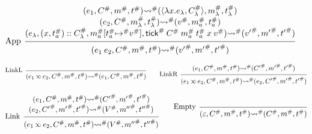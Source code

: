 \documentclass[acmsmall,review]{acmart}\settopmatter{printfolios=true,printccs=false,printacmref=false}
\theoremstyle{definition}
\newcommand*{\cons}{::}
\newcommand*{\A}[1]{{#1}^{\#}}
\newcommand*{\mem}{m}
\newcommand*{\semarrow}{\rightsquigarrow}
\newcommand*{\semlink}{\mathbin{\rotatebox[origin=c]{180}{$\propto$}}}
\newcommand*{\link}[2]{{#1}\semlink{#2}}
\newcommand*{\tick}{\mathsf{tick}}
\begin{document}
\begin{figure}[h!]
  \[
    \begin{prooftree}
      \hypo{
        \begin{matrix}
          (e_{1}, \A{C}, \A\mem, \A{t})
          \A\semarrow
          (\langle\lambda x.e_{\lambda}, \A{C}_{\lambda}\rangle, \A\mem_{\lambda}, \A{t}_{\lambda}) \\
          (e_{2}, \A{C}, \A\mem_{\lambda}, \A{t}_{\lambda})
          \A\semarrow
          (\A{v}, \A\mem_{a}, \A{t}_{a})                                                            \\
          (e_{\lambda}, (x, \A{t}_{a})\cons \A{C}_{\lambda}, \A\mem_{a}[\A{t}_{a}\A\mapsto \A{v}], \A\tick\:\A{C}\:\A\mem_{a}\:\A{t}_{a}\:x\:\A{v})
          \A\semarrow
          (\A{v'}, \A{\mem'},\A{t'})
        \end{matrix}
      }
      \infer[left label={App}]1{
      (e_{1}\:e_{2}, \A{C}, \A\mem, \A{t})
      \A\semarrow
      (\A{v'}, \A{\mem'},\A{t'})
      }
    \end{prooftree}
  \]

  \[
    \begin{prooftree}
      \infer[left label=LinkL]0{
      (\link{e_{1}}{e_{2}}, \A{C}, \A\mem, \A{t})
      \A\semarrow
      (e_{1}, \A{C}, \A\mem, \A{t})
      }
    \end{prooftree}\qquad
    \begin{prooftree}
      \hypo{
        \begin{matrix}
          (e_{1}, \A{C}, \A\mem, \A{t})
          \A\semarrow
          (\A{C'}, \A{\mem'}, \A{t'})
        \end{matrix}
      }
      \infer[left label=LinkR]1{
      (\link{e_{1}}{e_{2}}, \A{C}, \A\mem, \A{t})
      \A\semarrow
      (e_{2}, \A{C'}, \A{\mem'}, \A{t'})
      }
    \end{prooftree}
  \]

  \[
    \begin{prooftree}
      \hypo{
        \begin{matrix}
          (e_{1}, \A{C}, \A\mem, \A{t})
          \A\semarrow
          (\A{C'}, \A{\mem'}, \A{t'}) \\
          (e_{2}, \A{C'}, \A{\mem'}, \A{t'})
          \A\semarrow
          (\A{V}, \A{\mem''}, \A{t''})
        \end{matrix}
      }
      \infer[left label=Link]1{
      (\link{e_{1}}{e_{2}}, \A{C}, \A\mem, \A{t})
      \A\semarrow
      (\A{V}, \A{\mem''}, \A{t''})
      }
    \end{prooftree}\qquad
    \begin{prooftree}
      \infer[left label=Empty]0{
      (\varepsilon, \A{C}, \A\mem, \A{t})
      \A\semarrow
      (\A{C}, \A\mem, \A{t})
      }
    \end{prooftree}
  \]


\end{figure}
\end{document}
